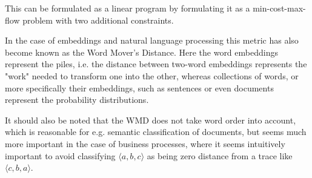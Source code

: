 \documentclass[runningheads]{template/llncs}
\begin{document}
This can be formulated as a linear program by formulating it as a min-cost-max-flow problem with two additional constraints. 

In the case of embeddings and natural language processing this metric has also become known as the Word Mover's Distance.
Here the word embeddings represent the piles, i.e. the distance between two-word embeddings represents the "work" needed to transform one into the other, whereas collections of words, or more specifically their embeddings, such as sentences or even documents represent the probability distributions.

It should also be noted that the WMD does not take word order into account, which is reasonable for e.g. semantic classification of documents, but seems much more important in the case of business processes, where it seems intuitively important to avoid classifying $\langle a,b,c\rangle$ as being zero distance from a trace like $\langle c,b,a \rangle$.
\end{document}
